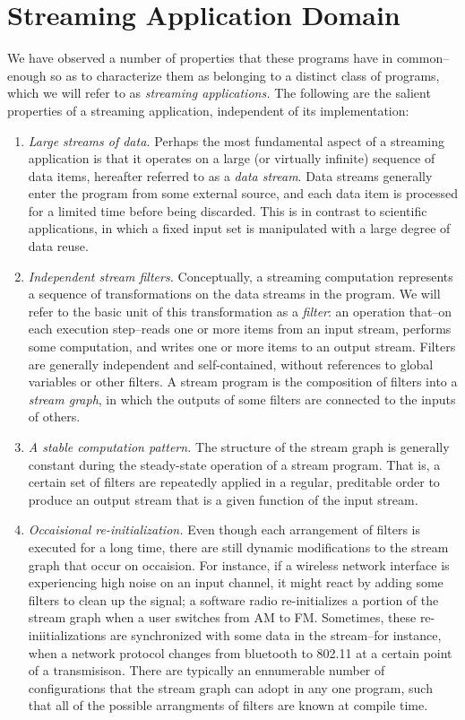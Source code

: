 \section{Streaming Application Domain}
\label{sec:domain}

We have observed a number of properties that these programs have in
common--enough so as to characterize them as belonging to a distinct
class of programs, which we will refer to as {\it streaming
applications.}  The following are the salient properties of a
streaming application, independent of its implementation:

\begin{enumerate}

\item {\it Large streams of data.}  Perhaps the most fundamental
aspect of a streaming application is that it operates on a large (or
virtually infinite) sequence of data items, hereafter referred to as a
{\it data stream}.  Data streams generally enter the program from some
external source, and each data item is processed for a limited time
before being discarded.  This is in contrast to scientific
applications, in which a fixed input set is manipulated with a large
degree of data reuse.

\item {\it Independent stream filters.}  Conceptually, a streaming computation
represents a sequence of transformations on the data streams in the
program.  We will refer to the basic unit of this transformation as a
{\it filter}: an operation that--on each execution step--reads one or
more items from an input stream, performs some computation, and writes
one or more items to an output stream.  Filters are generally
independent and self-contained, without references to global variables
or other filters.  A stream program is the composition of filters into
a {\it stream graph}, in which the outputs of some filters are
connected to the inputs of others.

\item {\it A stable computation pattern.}  The structure of the stream
graph is generally constant during the steady-state operation of a
stream program.  That is, a certain set of filters are repeatedly
applied in a regular, preditable order to produce an output stream
that is a given function of the input stream.

\item {\it Occaisional re-initialization.}  Even though each
arrangement of filters is executed for a long time, there are still
dynamic modifications to the stream graph that occur on occaision.
For instance, if a wireless network interface is experiencing high
noise on an input channel, it might react by adding some filters to
clean up the signal; a software radio re-initializes a portion of the
stream graph when a user switches from AM to FM.  Sometimes, these
re-iniitializations are synchronized with some data in the stream--for
instance, when a network protocol changes from bluetooth to 802.11 at
a certain point of a transmisison.  There are typically an ennumerable
number of configurations that the stream graph can adopt in any one
program, such that all of the possible arrangments of filters are
known at compile time.


\end{enumerate}
